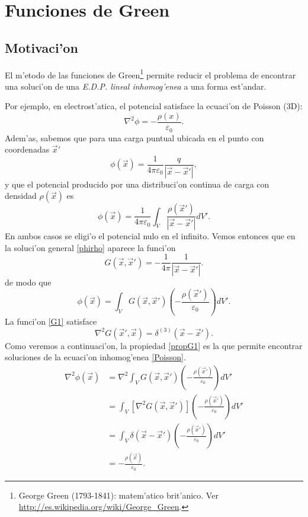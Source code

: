 \chapter{Funciones de Green}

\section{Motivaci'on}

El m'etodo de las funciones de Green\footnote{George Green (1793-1841): matem'atico brit'anico. Ver \url{http://es.wikipedia.org/wiki/George_Green}.} permite reducir el problema de encontrar una soluci'on de una \textit{E.D.P. lineal inhomog'enea} a una forma est'andar.

Por ejemplo, en electrost'atica, el potencial satisface la ecuaci'on de Poisson (3D):
\begin{equation}\label{Poisson}
\nabla^2\phi=-\frac{\rho(x)}{\varepsilon_0}.
\end{equation}
Adem'as, sabemos que para una carga puntual ubicada en el punto con coordenadas $\vec{x}'$
\begin{equation}
\phi(\vec{x})=\frac{1}{4\pi\varepsilon_0}\frac{q}{\left|\vec{x}-\vec{x}'\right|},
\end{equation}
y que el potencial producido por una distribuci'on continua de carga con densidad $\rho(\vec{x})$ es
\begin{equation}\label{phirho}
\phi(\vec{x})=\frac{1}{4\pi\varepsilon_0}\int_V\frac{\rho(\vec{x}')}{\left|\vec{x}-\vec{x}'\right|}dV'.
\end{equation}
En ambos casos se eligi'o el potencial nulo en el infinito. Vemos entonces que en la soluci'on general \eqref{phirho} aparece la funci'on
\begin{equation}\label{G1}
G(\vec{x},\vec{x}')=-\frac{1}{4\pi}\frac{1}{\left|\vec{x}-\vec{x}'\right|}.
\end{equation}
de modo que 
\begin{equation}\label{phirho2}
\phi(\vec{x})=\int_V G(\vec{x},\vec{x}')\left(-\frac{\rho(\vec{x}')}{\varepsilon_0}\right)dV'.
\end{equation}
La funci'on \eqref{G1} satisface
\begin{equation}\label{propG1}
\nabla^2G(\vec{x}',\vec{x})=\delta^{(3)}(\vec{x}-\vec{x}').
\end{equation}
Como veremos a continuaci'on, la propiedad \eqref{propG1} es la que permite encontrar soluciones de la ecuaci'on inhomog'enea \eqref{Poisson}.
\begin{align}
\nabla^2\phi(\vec{x}) &= \nabla^2\int_V G(\vec{x},\vec{x}')\left(-\frac{\rho(\vec{x}')} {\varepsilon_0}\right)dV'\\
&= \int_V \left[\nabla^2G(\vec{x},\vec{x}')\right]\left(-\frac{\rho(\vec{x}')}{\varepsilon_0}\right)dV' \\
&= \int_V \delta(\vec{x}-\vec{x}')\left(-\frac{\rho(\vec{x}')}{\varepsilon_0}\right)dV'\\
&= -\frac{\rho(\vec{x})}{\varepsilon_0}.
\end{align}


